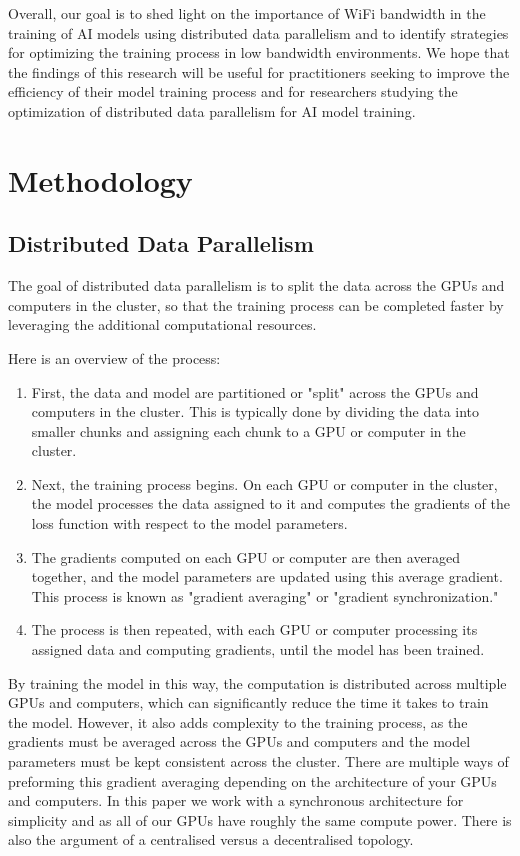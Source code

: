 \documentclass[11pt]{article}
\begin{document}
Overall, our goal is to shed light on the importance of WiFi bandwidth in the training of AI models using distributed data parallelism and to identify strategies for optimizing the training process in low bandwidth environments. We hope that the findings of this research will be useful for practitioners seeking to improve the efficiency of their model training process and for researchers studying the optimization of distributed data parallelism for AI model training.

\section{Methodology}
\subsection{Distributed Data Parallelism}
The goal of distributed data parallelism is to split the data across the GPUs and computers in the cluster, so that the training process can be completed faster by leveraging the additional computational resources.

Here is an overview of the process:

\begin{enumerate}
	\item First, the data and model are partitioned or "split" across the GPUs and computers in 			  the cluster. This is typically done by dividing the data into smaller chunks and 	  				   assigning each chunk to a GPU or computer in the cluster.
	\item Next, the training process begins. On each GPU or computer in the cluster, the model 				  processes the data assigned to it and computes the gradients of the loss function with 		  respect to the model parameters.
	\newpage
	\item The gradients computed on each GPU or computer are then averaged together, and the 				  model parameters are updated using this average gradient. This process is known as 				  "gradient averaging" or "gradient synchronization."
	\item The process is then repeated, with each GPU or computer processing its assigned data 				  and computing gradients, until the model has been trained.
\end{enumerate}

By training the model in this way, the computation is distributed across multiple GPUs and computers, which can significantly reduce the time it takes to train the model. However, it also adds complexity to the training process, as the gradients must be averaged across the GPUs and computers and the model parameters must be kept consistent across the cluster. There are multiple ways of preforming this gradient averaging depending on the architecture of your GPUs and computers. In this paper we work with a synchronous architecture for simplicity and as all of our GPUs have roughly the same compute power. There is also the argument of a centralised versus a decentralised topology.
\end{document}
